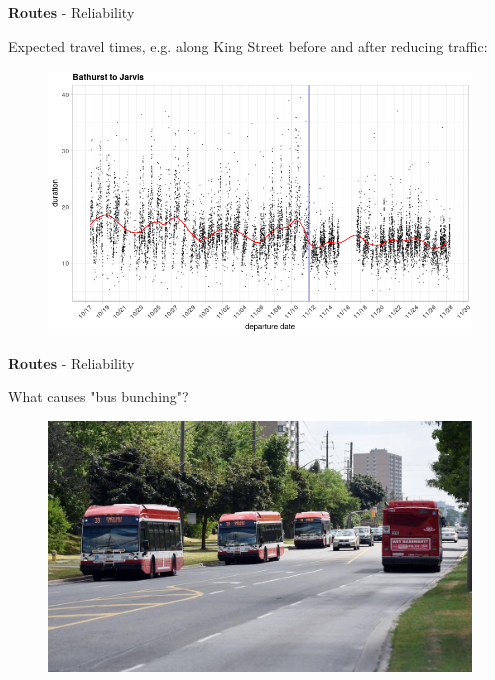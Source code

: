 \documentclass[aspectratio=169]{beamer}
\begin{document}
\begin{frame}
	
	\textbf{Routes} - Reliability
	
	\vspace{2mm}
	
	Expected travel times, e.g. along King Street before and after reducing traffic:
	
	\begin{figure}
		\centering
		\includegraphics[width=0.8\linewidth]{images/king-street.png}
	\end{figure}
	
	
\end{frame}



\begin{frame}
	
	\textbf{Routes} - Reliability
	
	\vspace{2mm}
	
	What causes "bus bunching"?
	
	\begin{figure}
		\centering
		\includegraphics[width=0.8\linewidth]{images/finch39.jpg}
	\end{figure}
	
	
\end{frame}
\end{document}
